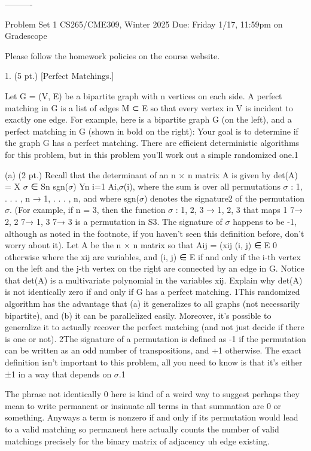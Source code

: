 

----------

Problem Set 1 CS265/CME309, Winter 2025
Due: Friday 1/17, 11:59pm on Gradescope

Please follow the homework policies on the course website.

1. (5 pt.) [Perfect Matchings.]

Let G = (V, E) be a bipartite graph with n vertices on each side. A perfect matching in G is a list of edges M ⊂ E so that every vertex in V is incident to exactly one edge. For example, here is a bipartite graph G (on the left), and a perfect matching in G (shown in bold on the right): Your goal is to determine if the graph G has a perfect matching. There are efficient deterministic algorithms for this problem, but in this problem you'll work out a simple randomized one.1

(a) (2 pt.) Recall that the determinant of an n $\times$ n matrix A is given by det(A) = X $\sigma$ ∈ Sn sgn($\sigma$) Yn i=1 Ai,$\sigma$(i), where the sum is over all permutations $\sigma$ : {1, . . . , n} → {1, . . . , n}, and where sgn($\sigma$) denotes the signature2 of the permutation $\sigma$. (For example, if n = 3, then the function $\sigma$ : {1, 2, 3} → {1, 2, 3} that maps 1 7→ 2, 2 7→ 1, 3 7→ 3 is a permutation in S3. The signature of $\sigma$ happens to be -1, although as noted in the footnote, if you haven't seen this definition before, don't worry about it). Let A be the n $\times$ n matrix so that Aij = (xij (i, j) ∈ E 0 otherwise where the xij are variables, and (i, j) ∈ E if and only if the i-th vertex on the left and the j-th vertex on the right are connected by an edge in G. Notice that det(A) is a multivariate polynomial in the variables xij. Explain why det(A) is not identically zero if and only if G has a perfect matching. 1This randomized algorithm has the advantage that (a) it generalizes to all graphs (not necessarily bipartite), and (b) it can be parallelized easily. Moreover, it's possible to generalize it to actually recover the perfect matching (and not just decide if there is one or not). 2The signature of a permutation is defined as -1 if the permutation can be written as an odd number of transpositions, and +1 otherwise. The exact definition isn't important to this problem, all you need to know is that it's either ±1 in a way that depends on $\sigma$.1

The phrase not identically $0$ here is kind of a weird way to suggest perhaps they mean to write permanent or insinuate all terms in that summation are $0$ or something. Anyways a term is nonzero if and only if its permutation would lead to a valid matching so permanent here actually counts the number of valid matchings precisely for the binary matrix of adjacency uh edge existing.


